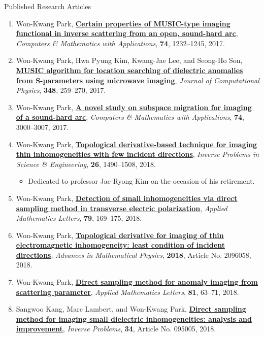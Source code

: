 \documentclass{resume} %
\begin{document}
\begin{rSection}{Published Research Articles}
\begin{enumerate}
\item\label{A-CAMWA2017A}  Won-Kwang Park, \href{http://dx.doi.org/10.1016/j.camwa.2017.06.009}{\textbf{Certain properties of MUSIC-type imaging functional in inverse scattering from an open, sound-hard arc}}, \textit{Computers \& Mathematics with Applications}, \textbf{74}, 1232--1245, 2017.
\item\label{A-JCOMP2017B} Won-Kwang Park, Hwa Pyung Kim, Kwang-Jae Lee, and Seong-Ho Son, \href{http://dx.doi.org/10.1016/j.jcp.2017.07.035}{\textbf{MUSIC algorithm for location searching of dielectric anomalies from S-parameters using microwave imaging}}, \textit{Journal of Computational Physics}, \textbf{348}, 259--270, 2017.
\item\label{A-CAMWA2017B} Won-Kwang Park, \href{http://dx.doi.org/10.1016/j.camwa.2017.07.045}{\textbf{A novel study on subspace migration for imaging of a sound-hard arc}}, \textit{Computers \& Mathematics with Applications}, \textbf{74}, 3000--3007, 2017.
\item\label{A-GIPE2018} Won-Kwang Park, \href{http://dx.doi.org/10.1080/17415977.2017.1411913}{\textbf{Topological derivative-based technique for imaging thin inhomogeneities with few incident directions}}, \textit{Inverse Problems in Science \& Engineering}, \textbf{26}, 1490--1508, 2018.
    \begin{itemize}
      \item Dedicated to professor Jae-Ryong Kim on the occasion of his retirement.
    \end{itemize}
\item\label{A-AML2018A} Won-Kwang Park, \href{https://doi.org/10.1016/j.aml.2017.12.016}{\textbf{Detection of small inhomogeneities via direct sampling method in transverse electric polarization}}, \textit{Applied Mathematics Letters}, \textbf{79}, 169--175, 2018.
\item\label{A-AMP2018} Won-Kwang Park, \href{https://doi.org/10.1155/2018/2096058}{\textbf{Topological derivative for imaging of thin electromagnetic inhomogeneity: least condition of incident directions}}, \textit{Advances in Mathematical Physics}, \textbf{2018}, Article No. 2096058, 2018.
\item\label{A-AML2018B} Won-Kwang Park, \href{https://doi.org/10.1016/j.aml.2018.02.001}{\textbf{Direct sampling method for anomaly imaging from scattering parameter}}, \textit{Applied Mathematics Letters}, \textbf{81}, 63--71, 2018.
\item\label{A-IP2018A} Sangwoo Kang, Marc Lambert, and Won-Kwang Park, \href{https://doi.org/10.1088/1361-6420/aacf1d}{\textbf{Direct sampling method for imaging small dielectric inhomogeneities: analysis and improvement}}, \textit{Inverse Problems}, \textbf{34}, Article No. 095005, 2018.

\end{enumerate}
\end{rSection}
\end{document}
